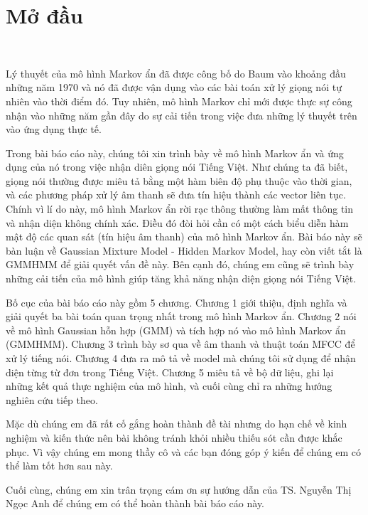 \documentclass[13pt]{extreport}
\begin{document}
\tableofcontents
\newpage


\newpage
{}

\chapter*{Mở đầu}\
\par Lý thuyết của mô hình Markov ẩn đã được công bố do Baum vào khoảng đầu những năm 1970 và nó đã được vận dụng vào các bài toán xử lý giọng nói tự nhiên vào thời điểm đó. Tuy nhiên, mô hình Markov chỉ mới được thực sự công nhận vào những năm gần đây do sự cải tiến trong việc đưa những lý thuyết trên vào ứng dụng thực tế.
\par Trong bài báo cáo này, chúng tôi xin trình bày về mô hình Markov ẩn và ứng dụng của nó trong việc nhận diên giọng nói Tiếng Việt. Như chúng ta đã biết, giọng nói thường được miêu tả bằng một hàm biên độ phụ thuộc vào thời gian, và các phương pháp xử lý âm thanh sẽ đưa tín hiệu thành các vector liên tục. Chính vì lí do này, mô hình Markov ẩn rời rạc thông thường làm mất thông tin và nhận diện không chính xác. Điều đó đòi hỏi cần có một cách biểu diễn hàm mật độ các quan sát (tín hiệu âm thanh) của mô hình Markov ẩn. Bài báo này sẽ bàn luận về Gaussian Mixture Model - Hidden Markov Model, hay còn viết tắt là GMMHMM để giải quyết vấn đề này. Bên cạnh đó, chúng em cũng sẽ trình bày những cải tiến của mô hình giúp tăng khả năng nhận diện giọng nói Tiếng Việt.
\par Bố cục của bài báo cáo này gồm 5 chương. Chương 1 giới thiệu, định nghĩa và giải quyết ba bài toán quan trọng nhất trong mô hình Markov ẩn. Chương 2 nói về mô hình Gaussian hỗn hợp (GMM) và tích hợp nó vào mô hình Markov ẩn (GMMHMM). Chương 3 trình bày sơ qua về âm thanh và thuật toán MFCC để xử lý tiếng nói. Chương 4 đưa ra mô tả về model mà chúng tôi sử dụng để nhận diện từng từ đơn trong Tiếng Việt. Chương 5 miêu tả về bộ dữ liệu, ghi lại những kết quả thực nghiệm của mô hình, và cuối cùng chỉ ra những hướng nghiên cứu tiếp theo.
\par Mặc dù chúng em đã rất cố gắng hoàn thành đề tài nhưng do hạn chế về kinh nghiệm
và kiến thức nên bài không tránh khỏi nhiều thiếu sót cần được khắc
phục. Vì vậy chúng em mong thầy cô và các bạn đóng góp ý kiến để chúng em có thể làm tốt
hơn sau này.
\par Cuối cùng, chúng em xin trân trọng cám ơn sự hướng dẫn của TS. Nguyễn Thị Ngọc Anh để chúng em có thể hoàn thành bài báo cáo này.
\end{document}
